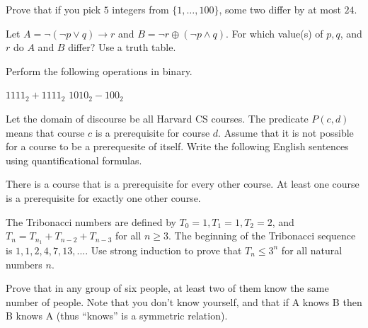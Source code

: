 \documentclass[solution, letterpaper]{cs20exam}
\begin{document}

\problem{}{} Prove that if you pick $5$ integers from $\{1, \ldots, 100\}$, some two differ by at most $24$.

\begin{solution}
\end{solution}

\problem{}{} Let $A = \neg (\neg p \lor q) \to r$ and $B = \neg r \oplus (\neg p \land q)$. For which value(s) of $p, q$, and $r$ do $A$ and $B$ differ? Use a truth table.

\begin{solution}
\end{solution}

\problem{}{} Perform the following operations in binary.

\subproblem $1111_2 + 1111_2$
\subproblem $1010_2 - 100_2$

\begin{solution}
\end{solution}

\problem{}{} Let the domain of discourse be all Harvard CS courses. The predicate $P(c, d)$ means that course $c$ is a prerequisite for course $d$. Assume that it is not possible for a course to be a prerequesite of itself. Write the following English sentences using quantificational formulas.

\subproblem There is a course that is a prerequisite for every other course.
\subproblem At least one course is a prerequisite for exactly one other course.

\begin{solution}
\end{solution}

\problem{}{} The Tribonacci numbers are defined by $T_0 = 1, T_1 = 1, T_2 = 2$, and $T_n = T_{n_1} + T_{n-2} + T_{n-3}$ for all $n \ge 3$. The beginning of the Tribonacci sequence is $1, 1, 2, 4, 7, 13, ...$. Use strong induction to prove that $T_n \le 3^n$ for all natural numbers $n$.

\begin{solution}
\end{solution}


\problem{}{}

Prove that in any group of six people, at least two of them know the same number of people. Note that you don't know yourself, and that if A knows B then B knows A (thus ``knows'' is a symmetric relation). 

\begin{solution}
\end{solution}
\end{document}
